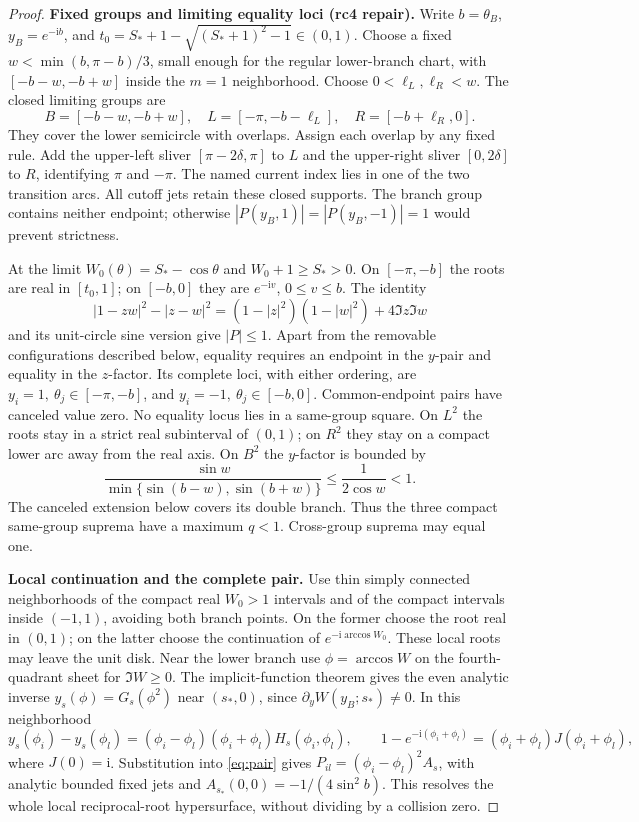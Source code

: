 \documentclass[11pt]{article}
\numberwithin{equation}{section}
\theoremstyle{definition}
\newcommand{\ii}{\mathrm i}
\begin{document}
\begin{proof}
\noindent\textbf{Fixed groups and limiting equality loci (rc4 repair).}
Write \(b=\theta_B\), \(y_B=e^{-\ii b}\), and
\(t_0=S_*+1-\sqrt{(S_*+1)^2-1}\in(0,1)\).
Choose a fixed \(w<\min(b,\pi-b)/3\), small enough for the
regular lower-branch chart, with \([-b-w,-b+w]\) inside the
\(m=1\) neighborhood. Choose \(0<\ell_L,\ell_R<w\).
The closed limiting groups are
\[
 B=[-b-w,-b+w],\quad L=[-\pi,-b-\ell_L],\quad
 R=[-b+\ell_R,0].
\]
They cover the lower semicircle with overlaps. Assign each overlap
by any fixed rule. Add the upper-left sliver \([\pi-2\delta,\pi]\)
to \(L\) and the upper-right sliver \([0,2\delta]\) to \(R\),
identifying \(\pi\) and \(-\pi\). The named current index lies
in one of the two transition arcs. All cutoff jets retain these
closed supports. The branch group contains neither endpoint;
otherwise \(|P(y_B,1)|=|P(y_B,-1)|=1\) would prevent strictness.

At the limit \(W_0(\theta)=S_*-\cos\theta\) and
\(W_0+1\ge S_*>0\). On \([-\pi,-b]\) the roots are real
in \([t_0,1]\); on \([-b,0]\) they are \(e^{-\ii v}\),
\(0\le v\le b\). The identity
\[
 |1-zw|^2-|z-w|^2
 =(1-|z|^2)(1-|w|^2)+4\Im z\Im w
\]
and its unit-circle sine version give \(|P|\le1\).
Apart from the removable configurations described below, equality
requires an endpoint in the \(y\)-pair and equality in the
\(z\)-factor. Its complete loci, with either ordering, are
\(y_i=1,\ \theta_j\in[-\pi,-b]\), and
\(y_i=-1,\ \theta_j\in[-b,0]\). Common-endpoint pairs have
canceled value zero. No equality locus lies in a same-group square.
On \(L^2\) the roots stay in a strict real subinterval of \((0,1)\);
on \(R^2\) they stay on a compact lower arc away from the real axis.
On \(B^2\) the \(y\)-factor is bounded by
\[
 \frac{\sin w}{\min\{\sin(b-w),\sin(b+w)\}}
 \le\frac1{2\cos w}<1.
\]
The canceled extension below covers its double branch. Thus
the three compact same-group suprema have a maximum \(q<1\).
Cross-group suprema may equal one.

\par\smallskip\noindent\textbf{Local continuation and the complete pair.}
Use thin simply connected neighborhoods of the compact real
\(W_0>1\) intervals and of the compact intervals inside \((-1,1)\),
avoiding both branch points. On the former choose the root real
in \((0,1)\); on the latter choose the continuation of
\(e^{-\ii\arccos W_0}\). These local roots may leave the unit disk.
Near the lower branch use \(\phi=\arccos W\) on the
fourth-quadrant sheet for \(\Im W\ge0\).
The implicit-function theorem gives the even analytic inverse
\(y_s(\phi)=G_s(\phi^2)\) near \((s_*,0)\), since
\(\partial_yW(y_B;s_*)\ne0\). In this neighborhood
\[
 y_s(\phi_i)-y_s(\phi_l)
  =(\phi_i-\phi_l)(\phi_i+\phi_l)H_s(\phi_i,\phi_l),\qquad
 1-e^{-\ii(\phi_i+\phi_l)}=(\phi_i+\phi_l)J(\phi_i+\phi_l),
\]
where \(J(0)=\ii\). Substitution into \eqref{eq:pair} gives
\(P_{il}=(\phi_i-\phi_l)^2A_s\), with analytic bounded fixed
jets and \(A_{s_*}(0,0)=-1/(4\sin^2b)\).
This resolves the whole local reciprocal-root hypersurface,
without dividing by a collision zero.


\end{proof}
\end{document}
